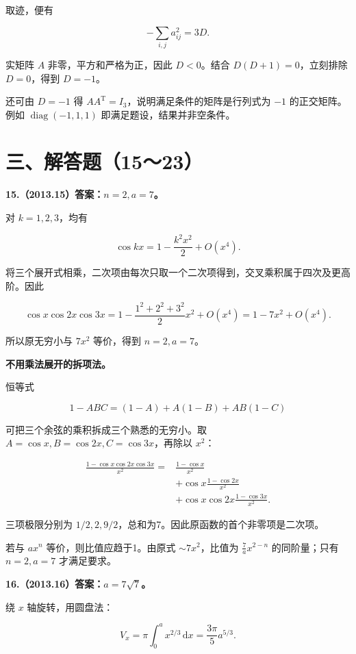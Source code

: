 \documentclass[UTF8,11pt,fontset=windows]{ctexart}
\begin{document}
取迹，便有

$$
-\sum_{i,j}a_{ij}^2=3D.
$$

实矩阵 $A$ 非零，平方和严格为正，因此 $D<0$。结合 $D(D+1)=0$，立刻排除 $D=0$，得到 $D=-1$。

还可由 $D=-1$ 得 $AA^{\mathrm T}=I_3$，说明满足条件的矩阵是行列式为 $-1$ 的正交矩阵。例如 $\operatorname{diag}(-1,1,1)$ 即满足题设，结果并非空条件。

\clearpage

\section*{三、解答题（15～23）}

\textbf{15.（2013.15）答案：$n=2,a=7$。}

对 $k=1,2,3$，均有

$$
\cos kx=1-\frac{k^2x^2}{2}+O(x^4).
$$

将三个展开式相乘，二次项由每次只取一个二次项得到，交叉乘积属于四次及更高阶。因此

$$
\cos x\cos2x\cos3x
=1-\frac{1^2+2^2+3^2}{2}x^2+O(x^4)
=1-7x^2+O(x^4).
$$

所以原无穷小与 $7x^2$ 等价，得到 $n=2,a=7$。

\textbf{不用乘法展开的拆项法。}

恒等式

$$
1-ABC=(1-A)+A(1-B)+AB(1-C)
$$

可把三个余弦的乘积拆成三个熟悉的无穷小。取 $A=\cos x,B=\cos2x,C=\cos3x$，再除以 $x^2$：

$$
\begin{aligned}
\frac{1-\cos x\cos2x\cos3x}{x^2}
={}&\frac{1-\cos x}{x^2}\\
&+\cos x\frac{1-\cos2x}{x^2}\\
&+\cos x\cos2x\frac{1-\cos3x}{x^2}.
\end{aligned}
$$

三项极限分别为 $1/2,2,9/2$，总和为7。因此原函数的首个非零项是二次项。

若与 $ax^n$ 等价，则比值应趋于1。由原式 $\sim7x^2$，比值为 $\frac7a x^{2-n}$ 的同阶量；只有 $n=2,a=7$ 才满足要求。

\clearpage

\textbf{16.（2013.16）答案：$a=7\sqrt7$。}

绕 $x$ 轴旋转，用圆盘法：

$$
V_x=\pi\int_0^a x^{2/3}\,\mathrm dx=\frac{3\pi}{5}a^{5/3}.
$$
\end{document}
